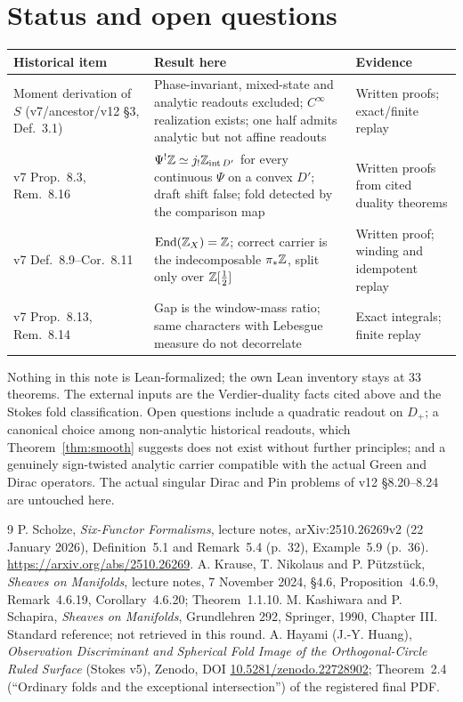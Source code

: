 \documentclass[11pt]{article}
\theoremstyle{definition}\newtheorem{definition}[theorem]{Definition}
\theoremstyle{remark}\newtheorem{remark}[theorem]{Remark}
\newcommand{\End}{\operatorname{End}}\newcommand{\inte}{\operatorname{int}}
\begin{document}
\section{Status and open questions}\label{sec:status}
\begin{center}\small
\begin{tabular}{>{\raggedright\arraybackslash}p{.24\linewidth}>{\raggedright\arraybackslash}p{.44\linewidth}>{\raggedright\arraybackslash}p{.22\linewidth}}\toprule
Historical item & Result here & Evidence\\\midrule
Moment derivation of $S$ (v7/ancestor/v12 \S3, Def.~3.1) & Phase-invariant, mixed-state and analytic readouts excluded; $C^\infty$ realization exists; one half admits analytic but not affine readouts & Written proofs; exact/finite replay\\
v7 Prop.~8.3, Rem.~8.16 & $\Psi^!\Z\simeq j_!\Z_{\inte D'}$ for every continuous $\Psi$ on a convex $D'$; draft shift false; fold detected by the comparison map & Written proofs from cited duality theorems\\
v7 Def.~8.9--Cor.~8.11 & $\End(\Z_X)=\Z$; correct carrier is the indecomposable $\pi_*\mathbb Z$, split only over $\mathbb Z[\frac12]$ & Written proof; winding and idempotent replay\\
v7 Prop.~8.13, Rem.~8.14 & Gap is the window-mass ratio; same characters with Lebesgue measure do not decorrelate & Exact integrals; finite replay\\\bottomrule
\end{tabular}
\end{center}

Nothing in this note is Lean-formalized; the own Lean inventory stays at 33
theorems. The external inputs are the Verdier-duality facts cited above and the
Stokes fold classification. Open questions include a quadratic readout on
$D_+$; a canonical choice among non-analytic historical readouts, which
Theorem~\ref{thm:smooth} suggests does not exist without further principles; and
a genuinely sign-twisted analytic carrier compatible with the actual Green and
Dirac operators. The actual singular Dirac and Pin problems of v12 \S8.20--8.24
are untouched here.

{\small\begin{thebibliography}{9}
 P. Scholze, \emph{Six-Functor Formalisms}, lecture notes,
 arXiv:2510.26269v2 (22 January 2026), Definition~5.1 and Remark~5.4 (p.~32),
 Example~5.9 (p.~36). \url{https://arxiv.org/abs/2510.26269}.
 A. Krause, T. Nikolaus and P. P\"utzst\"uck, \emph{Sheaves on
 Manifolds}, lecture notes, 7 November 2024, \S4.6, Proposition~4.6.9,
 Remark~4.6.19, Corollary~4.6.20; Theorem~1.1.10.
 M. Kashiwara and P. Schapira, \emph{Sheaves on Manifolds},
 Grundlehren 292, Springer, 1990, Chapter III. Standard reference; not
 retrieved in this round.
 A. Hayami (J.-Y. Huang), \emph{Observation Discriminant and
 Spherical Fold Image of the Orthogonal-Circle Ruled Surface} (Stokes v5),
 Zenodo, DOI \href{https://doi.org/10.5281/zenodo.22728902}{10.5281/zenodo.22728902};
 Theorem~2.4 (``Ordinary folds and the exceptional intersection'') of the
 registered final PDF.
\end{thebibliography}}
\end{document}
